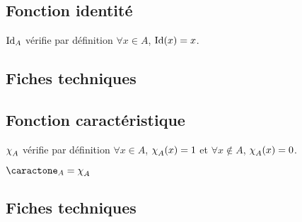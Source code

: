 \documentclass[12pt,a4paper]{article}
\begin{document}

\subsection{Fonction identité}

\begin{latexex}
$\operatorname*{\operatorname{Id}}_A$ vérifie par définition
$\forall x \in A$, $\operatorname*{\operatorname{Id}}(x) = x$.
\end{latexex}




\subsection{Fiches techniques}





\subsection{Fonction caractéristique}


\begin{latexex}
$\operatorname{\chi}_A$ vérifie par définition
$\forall x \in A$, $\operatorname{\chi}_A(x) = 1$ et
$\forall x \notin A$, $\operatorname{\chi}_A(x) = 0$.
\end{latexex}





\begin{latexex}
$\caractone_A = \caract_A$
\end{latexex}




\subsection{Fiches techniques}


    
\end{document}
